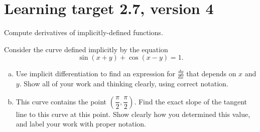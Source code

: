 \pagebreak

\section{Learning target 2.7, version 4}

Compute derivatives of implicitly-defined functions.

\hrulefill

Consider the curve defined implicitly by the equation
\[\sin(x+y) + \cos(x-y) = 1.\]

\begin{enumerate}[(a)]
	\item Use implicit differentiation to find an expression for $\frac{dy}{dx}$ that depends on $x$ and $y$.  Show all of your work and thinking clearly, using correct notation.

	\vfill

	\item This curve contains the point \(\left(\dfrac\pi{2},\dfrac\pi{2}\right)\). Find the exact slope of the tangent line to this curve at this point. Show clearly how you determined this value, and label your work with proper notation.

	\vfill
\end{enumerate}


